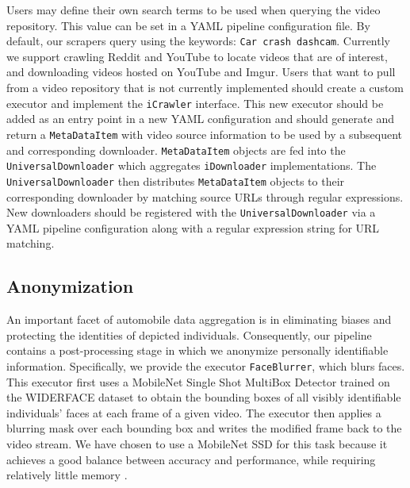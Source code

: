 \documentclass[letterpaper, 10 pt, conference]{ieeeconf}
\newcommand{\todo}[1]{{\color{red}#1}}
\begin{document}
Users may define their own search terms to be used when querying the video repository. This value can be set in a YAML pipeline configuration file. By default, our scrapers query using the keywords: \texttt{Car crash dashcam}. Currently we support crawling Reddit and YouTube to locate videos that are of interest, and downloading videos hosted on YouTube and Imgur. Users that want to pull from a video repository that is not currently implemented should create a custom executor and implement the \texttt{iCrawler} interface. This new executor should be added as an entry point in a new YAML configuration and should generate and return a \texttt{MetaDataItem} with video source information to be used by a subsequent and corresponding downloader. \texttt{MetaDataItem} objects are fed into the \texttt{UniversalDownloader} which aggregates \texttt{iDownloader} implementations. The \texttt{UniversalDownloader} then distributes \texttt{MetaDataItem} objects to their corresponding downloader by matching source URLs through regular expressions. New downloaders should be registered with the \texttt{UniversalDownloader} via a YAML pipeline configuration along with a regular expression string for URL matching.

\subsection{Anonymization}
An important facet of automobile data aggregation is in eliminating biases and protecting the identities of depicted individuals. Consequently, our pipeline contains a post-processing stage in which we anonymize personally identifiable information. Specifically, we provide the executor \texttt{FaceBlurrer}, which blurs faces. This executor first uses a MobileNet Single Shot MultiBox Detector \cite{yixuan_h_y_hu_2021_4642275} trained on the WIDERFACE dataset \cite{yang2016wider} to obtain the bounding boxes of all visibly identifiable individuals' faces at each frame of a given video. The executor then applies a blurring mask over each bounding box and writes the modified frame back to the video stream. We have chosen to use a MobileNet SSD for this task because it achieves a good balance between accuracy and performance, while requiring relatively little memory \cite{yixuan_h_y_hu_2021_4642275}.
\end{document}
